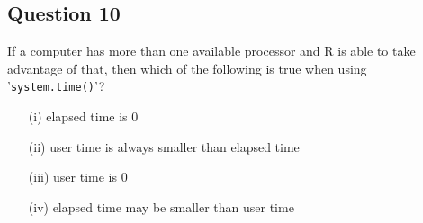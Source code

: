 \documentclass[11pt]{article} %
\begin{document}
\subsection*{Question 10}
If a computer has more than one available processor and R is able to take advantage of that, then which of the following is true when using '\texttt{system.time()}'?
\begin{itemize}
\item[(i)] elapsed time is 0
\item[(ii)] user time is always smaller than elapsed time
\item[(iii)] user time is 0
\item[(iv)] elapsed time may be smaller than user time
\end{itemize}
\end{document}
